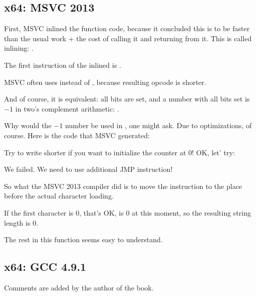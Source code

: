 ﻿\subsection{x64: \Optimizing MSVC 2013}



First, MSVC inlined the \strlen{} function code, because it concluded this 
is to be faster than the usual \strlen{} work + the cost of calling it and returning from it.
This is called inlining: .

\label{using_OR_instead_of_MOV}
The first instruction of 
the inlined \strlen{} is . 

MSVC often uses  instead of , because resulting opcode is shorter.

And of course, it is equivalent: all bits are set, and a number with all bits set is $-1$ 
in two's complement arithmetic: .

Why would the $-1$ number be used in \strlen{}, one might ask.
Due to optimizations, of course.
Here is the code that MSVC generated:



Try to write shorter if you want to initialize the counter at 0!
OK, let' try:



We failed. We need to use additional JMP instruction!

So what the MSVC 2013 compiler did is to move the  instruction to the place before 
the actual character loading.

If the first character is 0, that's OK, \RAX is 0 at this moment, 
so the resulting string length is 0.

The rest in this function seems easy to understand.

\subsection{x64: \NonOptimizing GCC 4.9.1}



Comments are added by the author of the book.

